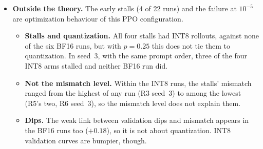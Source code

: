 \documentclass[11pt]{article}
\begin{document}
\begin{itemize}
\begin{itemize}
\begin{itemize}
    \item It tracks neither entropy nor the drift from the reference model. Attributing it is E3.
    \end{itemize}
  \item \textbf{The side hypothesis of the theory note's Section~3.5 is not supported.} UAQ's slower norm gains were to slow mismatch growth. R4's mismatch is not lower than R3's, either on average ($1.04\times$) or at the end of training (steps 400--435: $1.13\times$, $1.56\times$ and $0.88\times$ per seed).
  \item \textbf{What is at stake.} INT8 rollouts cost about 5 points of accuracy here: 4.9 points averaged over UAQ (95\% CI $[2.3, 7.6]$), and every BF16 run ends above every INT8 run. The gap comes with lower training reward, higher entropy and more drift from the reference model. Several causes are open:
  \begin{itemize}
  \item the persistent rounding error of Proposition~6;
  \item the bias of TIS's truncation;
  \item scoring on the INT8 engine.
  \end{itemize}
  Separating them is E3's task. Closing the gap is what P6 (dithered rollouts) would have to show.
  \end{itemize}
\item \textbf{Outside the theory.} The early stalls (4 of 22 runs) and the failure at $10^{-5}$ are optimization behaviour of this PPO configuration.
  \begin{itemize}
  \item \textbf{Stalls and quantization.} All four stalls had INT8 rollouts, against none of the six BF16 runs, but with $p=0.25$ this does not tie them to quantization. In seed~3, with the same prompt order, three of the four INT8 arms stalled and neither BF16 run did.
  \item \textbf{Not the mismatch level.} Within the INT8 runs, the stalls' mismatch ranged from the highest of any run (R3 seed~3) to among the lowest (R5's two, R6 seed~3), so the mismatch level does not explain them.
  \item \textbf{Dips.} The weak link between validation dips and mismatch appears in the BF16 runs too ($+0.18$), so it is not about quantization. INT8 validation curves are bumpier, though.
  \end{itemize}

\end{itemize}
\end{document}
